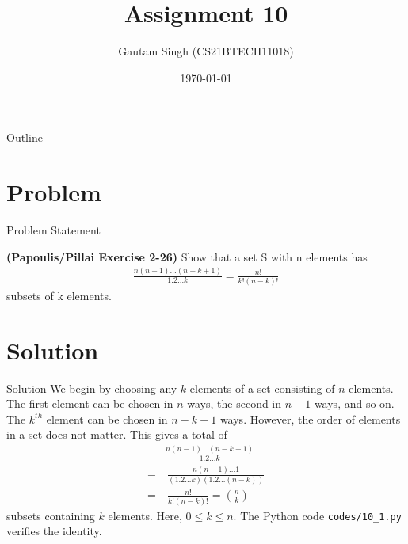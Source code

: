 \documentclass{beamer}
\title{Assignment 10}
\author{Gautam Singh (CS21BTECH11018)}
\date{\today}
\begin{document}
\begin{frame}
    \titlepage 
\end{frame}

\logo{}


\begin{frame}{Outline}
    \tableofcontents
\end{frame}


\section{Problem}
\begin{frame}{Problem Statement}

\textbf{(Papoulis/Pillai Exercise 2-26)} Show that a set S with n elements has
\begin{align}
    \frac{n(n - 1)\ldots(n - k + 1)}{1.2{\ldots}k} = \frac{n!}{k!(n - k)!}
\end{align}
subsets of k elements.

\end{frame}


\section{Solution}

\begin{frame}{Solution}
    We begin by choosing any $k$ elements of a set consisting of $n$ elements. The first element can be chosen in $n$ ways, the second in $n - 1$ ways, and so on. The $k^{th}$ element can be chosen in $n - k + 1$ ways. However, the order of elements in a set does not matter. This gives a total of
    \begin{align}
        &\frac{n(n - 1)\ldots(n - k + 1)}{1.2{\ldots}k} \\
        =&\ \frac{n(n - 1){\ldots}1}{(1.2{\ldots}k)(1.2{\ldots}(n - k))} \\
        =&\ \frac{n!}{k!(n - k)!} = \binom{n}{k} 
        \label{eq:proof}
    \end{align}
    subsets containing $k$ elements. Here, $0 \leq k \leq n$. The Python code \texttt{codes/10\_1.py} verifies the identity.
\end{frame}
\end{document}
